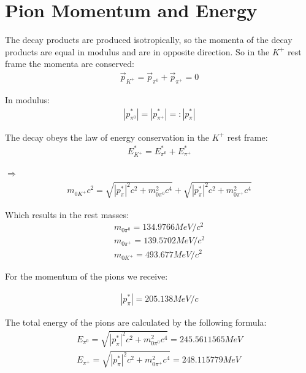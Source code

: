 \documentclass[a4paper,parskip,11pt, DIV12]{scrreprt}
\begin{document}
\section{Pion Momentum and Energy} \label{sec:pE}

The decay products are produced isotropically, so the momenta of the decay products are equal in modulus and are in opposite direction. 
So in the $K^+$ rest frame the momenta are conserved:
\begin{align*}
\overrightarrow{p}_{K^+} = \overrightarrow{p}_{\pi^0} + \overrightarrow{p}_{\pi^+} = 0
\end{align*}

In modulus:
\begin{align*}
|p^*_{\pi^0}| = |p^*_{\pi^+}| =: |p^*_{\pi}|
\end{align*}

The decay obeys the law of energy conservation in the $K^+$ rest frame:
\begin{align*}
E^*_{K^+} = E^*_{\pi^0} + E^*_{\pi^+}
\end{align*}

$\Rightarrow$
\begin{align*}
m_{0K^+}c^2 = \sqrt{|p^*_{\pi}|^2c^2 + m_{0\pi^0}^2c^4} + \sqrt{|p^*_{\pi}|^2c^2 + m_{0\pi^+}^2c^4}
\end{align*}

Which results in the rest masses:
\begin{align*}
m_{0\pi^0} = 134.9766 MeV/c^2\\
m_{0\pi^+} = 139.5702 MeV/c^2\\
m_{0K^+} = 493.677 MeV/c^2
\end{align*}

For the momentum of the pions we receive:

\begin{align*}
|p^*_{\pi}| = 205.138 MeV/c
\end{align*}

The total energy of the pions are calculated by the following formula:
\begin{align*}
E_{\pi^0} = \sqrt{|p^*_{\pi}|^2c^2 + m_{0\pi^0}^2c^4} = 245.5611565 MeV\\
E_{\pi^+} = \sqrt{|p^*_{\pi}|^2c^2 + m_{0\pi^+}^2c^4}= 248.115779 MeV
\end{align*}


\clearpage  

\end{document}
